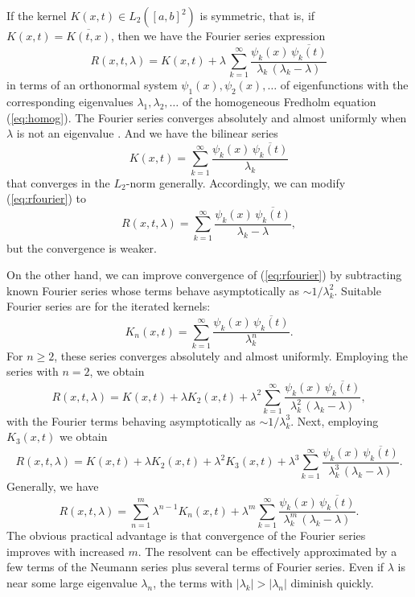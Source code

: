 \documentclass{article}
\begin{document}
If the kernel $K(x,t)\in L_2([a,b]^2)$ is symmetric, %
that is, if $K(x,t)=\overline{K(t,x)}$, then we have the Fourier series expression 
\begin{equation} \label{eq:rfourier}
R(x,t,\lambda)=K(x,t)+\lambda \,
\sum_{k=1}^{\infty} \frac{\psi_k(x)\,\overline{\psi_k(t)}}{\lambda_k\,(\lambda_k-\lambda)}
\end{equation}
in terms of an orthonormal system $\psi_1(x),\psi_2(x),\ldots$ of eigenfunctions \cite[Ch.~7]{Kanwal}
with the corresponding eigenvalues $\lambda_1,\lambda_2,\ldots$
of the homogeneous Fredholm equation (\ref{eq:homog}).
The Fourier series converges absolutely and almost uniformly
when $\lambda$ is not an eigenvalue \cite[p.~115]{Tricomi}.
And we have the bilinear series
\begin{equation}
K(x,t)=
\sum_{k=1}^{\infty} \frac{\psi_k(x)\,\overline{\psi_k(t)}}{\lambda_k}
\end{equation}
that converges in the $L_2$-norm generally. %
Accordingly, we can modify (\ref{eq:rfourier}) to
\begin{equation} \label{eq:rfourie}
R(x,t,\lambda)= 
\sum_{k=1}^{\infty} \frac{\psi_k(x)\,\overline{\psi_k(t)}}{\lambda_k-\lambda},
\end{equation}
but the convergence is weaker. 

On the other hand, we can improve convergence of (\ref{eq:rfourier})
by subtracting known Fourier series whose terms behave asymptotically as $\sim 1/\lambda_k^2$.
Suitable Fourier series are for the iterated kernels:
\begin{equation} 
K_n(x,t)=\sum_{k=1}^{\infty} \frac{\psi_k(x)\,\overline{\psi_k(t)}}{\lambda_k^n}.
\end{equation} 
For $n\ge 2$, these series converges absolutely and almost uniformly. %
Employing the series with $n=2$, we obtain
\begin{equation} \label{eq:rfourier1}
R(x,t,\lambda)=K(x,t)+\lambda K_2(x,t)+\lambda^2 
\sum_{k=1}^{\infty} \frac{\psi_k(x)\,\overline{\psi_k(t)}}{\lambda_k^2\,(\lambda_k-\lambda)},
\end{equation}
with the Fourier terms behaving asymptotically as $\sim 1/\lambda_k^3$.
Next, employing $K_3(x,t)$ we obtain
\[
R(x,t,\lambda)=K(x,t)+\lambda K_2(x,t)+\lambda^2 K_3(x,t)+\lambda^3
\sum_{k=1}^{\infty} \frac{\psi_k(x)\,\overline{\psi_k(t)}}{\lambda_k^3\,(\lambda_k-\lambda)}.
\]
Generally, we have
\begin{equation} \label{eq:rfourier2}
R(x,t,\lambda)=\sum_{n=1}^m \lambda^{n-1}K_n(x,t)+\lambda^m 
\sum_{k=1}^{\infty} \frac{\psi_k(x)\,\overline{\psi_k(t)}}{\lambda_k^m\,(\lambda_k-\lambda)}.
\end{equation}
The obvious practical advantage is that convergence of the Fourier series improves 
with increased $m$. The resolvent can be effectively approximated by a few terms of the Neumann series 
plus several terms of Fourier series. Even if $\lambda$ is near some large eigenvalue $\lambda_n$, 
the terms with $|\lambda_k|>|\lambda_n|$ diminish quickly. 
\end{document}
